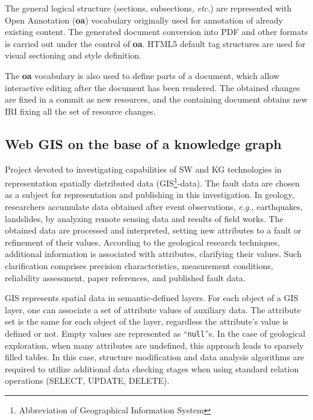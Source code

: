 \documentclass[a4paper]{jctart19a}
\begin{document}
The general logical structure (sections, subsections, \emph{etc.}) are represented with Open Annotation (\textbf{oa}) vocabulary originally used for annotation of already existing content. The generated document conversion into PDF and other formats is carried out under the control of \textbf{oa}.  HTML5 default tag structures are used for visual sectioning and style definition.

The \textbf{oa} vocabulary is also used to define parts of a document, which allow interactive editing after the document has been rendered.  The obtained changes are fixed in a commit as new resources, and the containing document obtains new IRI fixing all the set of resource changes.

\subsection{Web GIS on the base of a knowledge graph}
\label{sec:gis-impl}

Project \cite{gisviewer} devoted to investigating capabilities of SW and KG technologies in representation spatially distributed data (GIS\footnote{Abbreviation of Geographical Information System}-data).  The fault data \cite{lunina,afs} are chosen as a subject for representation and publishing in this investigation.  In geology, researchers accumulate data obtained after event observations, \emph{e.g.}, earthquakes, landslides, by analyzing remote sensing data and results of field works.  The obtained data are processed and interpreted, setting new attributes to a fault or refinement of their values.  According to the geological research techniques, additional information is associated with attributes, clarifying their values.  Such clarification comprises precision characteristics, measurement conditions, reliability assessment, paper references, and published fault data.

GIS represents spatial data in semantic-defined layers.  For each object of a GIS layer, one can associate a set of attribute values of auxiliary data.  The attribute set is the same for each object of the layer, regardless the attribute's value is defined or not.  Empty values are represented as ``\texttt{null}''s.  In the case of geological exploration, when many attributes are undefined, this approach leads to sparsely filled tables.  In this case, structure modification and data analysis algorithms are required to utilize additional data checking stages when using standard relation operations (SELECT, UPDATE, DELETE).
\end{document}

